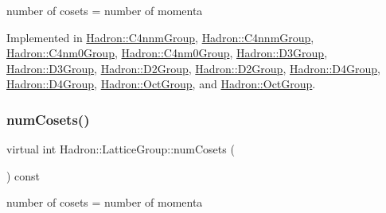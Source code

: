 number of cosets = number of momenta 

Implemented in \mbox{\hyperlink{structHadron_1_1C4nnmGroup_a38cf4c54a4dff0a3c056aa3a1dc4dca2}{Hadron\+::\+C4nnm\+Group}}, \mbox{\hyperlink{structHadron_1_1C4nnmGroup_a38cf4c54a4dff0a3c056aa3a1dc4dca2}{Hadron\+::\+C4nnm\+Group}}, \mbox{\hyperlink{structHadron_1_1C4nm0Group_ad38f333075aa53f1b0c7bded9f7e70ad}{Hadron\+::\+C4nm0\+Group}}, \mbox{\hyperlink{structHadron_1_1C4nm0Group_ad38f333075aa53f1b0c7bded9f7e70ad}{Hadron\+::\+C4nm0\+Group}}, \mbox{\hyperlink{structHadron_1_1D3Group_a33af6b6378351a7b023c23940c69403f}{Hadron\+::\+D3\+Group}}, \mbox{\hyperlink{structHadron_1_1D3Group_a33af6b6378351a7b023c23940c69403f}{Hadron\+::\+D3\+Group}}, \mbox{\hyperlink{structHadron_1_1D2Group_a1f8a4f5adef5a9a05edd39f14d21f1cd}{Hadron\+::\+D2\+Group}}, \mbox{\hyperlink{structHadron_1_1D2Group_a1f8a4f5adef5a9a05edd39f14d21f1cd}{Hadron\+::\+D2\+Group}}, \mbox{\hyperlink{structHadron_1_1D4Group_a97eed87299880400afc5e9bb1ee222bc}{Hadron\+::\+D4\+Group}}, \mbox{\hyperlink{structHadron_1_1D4Group_a97eed87299880400afc5e9bb1ee222bc}{Hadron\+::\+D4\+Group}}, \mbox{\hyperlink{structHadron_1_1OctGroup_a85ea73ed466c052783d454b14d5b30bc}{Hadron\+::\+Oct\+Group}}, and \mbox{\hyperlink{structHadron_1_1OctGroup_a85ea73ed466c052783d454b14d5b30bc}{Hadron\+::\+Oct\+Group}}.

\mbox{\label{structHadron_1_1LatticeGroup_afc76430f36a3a041f86d4058c59bf55e}} 
\subsubsection{\texorpdfstring{numCosets()}{numCosets()}\hspace{0.1cm}{\footnotesize\ttfamily [2/2]}}
{\footnotesize\ttfamily virtual int Hadron\+::\+Lattice\+Group\+::num\+Cosets (\begin{DoxyParamCaption}{ }\end{DoxyParamCaption}) const\hspace{0.3cm}{\ttfamily [pure virtual]}}

number of cosets = number of momenta 

